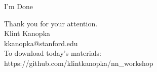 \documentclass{beamer}
\begin{document}
  
    \begin{frame}{I'm Done}
        \begin{center}
            Thank you for your attention. \\
            \vskip 1cm
            Klint Kanopka \\
            kkanopka@stanford.edu\\
            \vskip 1cm
            To download today's materials:\\
            https://github.com/klintkanopka/nn\_workshop
        \end{center}
    \end{frame}
    
\end{document}
